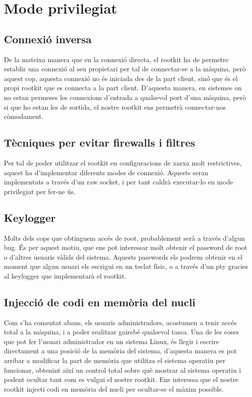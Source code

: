 \section{Mode privilegiat}

\subsection{Connexió inversa}
De la mateixa manera que en la connexió directa, el rootkit ha de permetre establir una connexió al seu propietari per tal de connectar-se
a la màquina, però aquest cop, aquesta connexió no és iniciada des de la part client, sinó que és el propi rootkit que es connecta 
a la part client. D'aquesta manera, en sistemes on no estan permeses les connexions d'entrada a qualsevol port d'una màquina, però si
que ho estan les de sortida, el nostre rootkit ens permetrà connectar-nos còmodament.

\subsection{Tècniques per evitar firewalls i filtres}
Per tal de poder utilitzar el rootkit en configuracions de xarxa molt restrictives, aquest ha d'implementar diferents modes de connexió.
Aquests seran implementats a través d'un raw socket, i per tant caldrà executar-lo en mode privilegiat per fer-ne ús.

\subsection{Keylogger}
Molts dels cops que obtinguem accés de root, probablement serà a través d'algun bug. És per aquest motiu, que ens pot interessar molt
obtenir el password de root o d'altres usuaris vàlids del sistema. Aquests passwords els podrem obtenir en el moment que algun usuari
els escrigui en un teclat físic, o a través d'un pty gracies al keylogger que implementarà el rootkit.

\subsection{Injecció de codi en memòria del nucli}
Com s'ha comentat abans, els usuaris administradors, acostumen a tenir accés total a la màquina, i a poder realitzar gairebé qualsevol tasca.
Una de les coses que pot fer l'usuari administrador en un sistema Linux, és llegir i escrire directament a una posició de la
memòria del sistema, d'aquesta manera es pot arribar a modificar la part de memòria que utilitza el sistema operatiu per funcionar,
obtenint així un control total sobre què mostrar al sistema operatiu i podent ocultar tant com es vulgui el nostre rootkit.
Ens interessa que el nostre rootkit injecti codi en memòria del nucli per ocultar-se el màxim possible.




